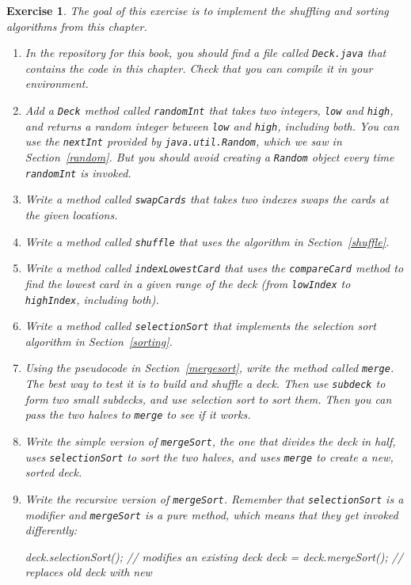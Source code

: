 \documentclass[12pt]{book}
\theoremstyle{exercise}
\newtheorem{exercise}{Exercise}[chapter]
\newcommand{\java}[1]{\verb"#1"}
\begin{document}
\begin{exercise}
The goal of this exercise is to implement the shuffling and sorting algorithms from this chapter.

\begin{enumerate}

\item In the repository for this book, you should find a file called \java{Deck.java} that contains the code in this chapter.
Check that you can compile it in your environment.

\item Add a \java{Deck} method called \java{randomInt} that takes two integers, \java{low} and \java{high}, and returns a random integer between \java{low} and \java{high}, including both.
You can use the \java{nextInt} provided by \java{java.util.Random}, which we saw in Section~\ref{random}.
But you should avoid creating a \java{Random} object every time \java{randomInt} is invoked.

\item Write a method called \java{swapCards} that takes two indexes swaps the cards at the given locations.

\item Write a method called \java{shuffle} that uses the algorithm in Section~\ref{shuffle}.

\item Write a method called \java{indexLowestCard} that uses the \java{compareCard} method to find the lowest card in a given range of the deck (from \java{lowIndex} to \java{highIndex}, including both).

\item Write a method called \java{selectionSort} that implements the selection sort algorithm in Section~\ref{sorting}.

\item Using the pseudocode in Section~\ref{mergesort}, write the method called \java{merge}.
The best way to test it is to build and shuffle a deck.
Then use \java{subdeck} to form two small subdecks, and use selection sort to sort them.
Then you can pass the two halves to \java{merge} to see if it works.

\item Write the simple version of \java{mergeSort}, the one that divides the deck in half, uses \java{selectionSort} to sort the two halves, and uses \java{merge} to create a new, sorted deck.

\item Write the recursive version of \java{mergeSort}.
Remember that \java{selectionSort} is a modifier and \java{mergeSort} is a pure method, which means that they get invoked differently:

\begin{code}
deck.selectionSort();         // modifies an existing deck
deck = deck.mergeSort();      // replaces old deck with new
\end{code}

\end{enumerate}
\end{exercise}
\end{document}
